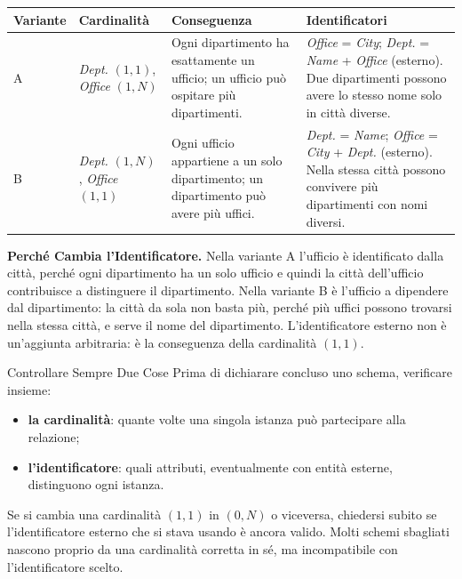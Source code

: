 \documentclass[12pt]{extarticle}
\begin{document}
\begin{center}
\small
\begin{tabular}{@{}L{2.6cm}L{4.0cm}L{5.2cm}L{4.4cm}@{}}
    \toprule
    \textbf{Variante} & \textbf{Cardinalità} & \textbf{Conseguenza} & \textbf{Identificatori} \\
    \midrule
    A & \textit{Dept.} $(1,1)$, \textit{Office} $(1,N)$ & Ogni dipartimento ha esattamente un ufficio; un ufficio può ospitare più dipartimenti. & \textit{Office} = \textit{City}; \textit{Dept.} = \textit{Name} + \textit{Office} (esterno). Due dipartimenti possono avere lo stesso nome solo in città diverse. \\
    \addlinespace
    B & \textit{Dept.} $(1,N)$, \textit{Office} $(1,1)$ & Ogni ufficio appartiene a un solo dipartimento; un dipartimento può avere più uffici. & \textit{Dept.} = \textit{Name}; \textit{Office} = \textit{City} + \textit{Dept.} (esterno). Nella stessa città possono convivere più dipartimenti con nomi diversi. \\
    \bottomrule
\end{tabular}
\end{center}

\medskip
\noindent \textbf{Perché Cambia l'Identificatore.} Nella variante A l'ufficio è identificato dalla città, perché ogni dipartimento ha un solo ufficio e quindi la città dell'ufficio contribuisce a distinguere il dipartimento. Nella variante B è l'ufficio a dipendere dal dipartimento: la città da sola non basta più, perché più uffici possono trovarsi nella stessa città, e serve il nome del dipartimento. L'identificatore esterno non è un'aggiunta arbitraria: è la conseguenza della cardinalità $(1,1)$.

\begin{cbox}{Controllare Sempre Due Cose}
\noindent Prima di dichiarare concluso uno schema, verificare insieme:
\begin{itemize}
    \item \textbf{la cardinalità}: quante volte una singola istanza può partecipare alla relazione;
    \item \textbf{l'identificatore}: quali attributi, eventualmente con entità esterne, distinguono ogni istanza.
\end{itemize}
Se si cambia una cardinalità $(1,1)$ in $(0,N)$ o viceversa, chiedersi subito se l'identificatore esterno che si stava usando è ancora valido. Molti schemi sbagliati nascono proprio da una cardinalità corretta in sé, ma incompatibile con l'identificatore scelto.
\end{cbox}
\end{document}
